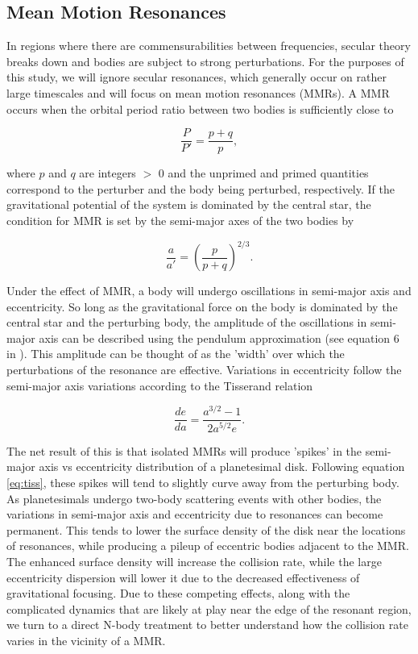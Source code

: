 \documentclass[twocolumn]{aastex63}
\begin{document}
\subsection{Mean Motion Resonances}

In regions where there are commensurabilities between frequencies, secular theory breaks down and bodies are subject to strong 
perturbations. For the purposes of this study, we will ignore secular resonances, which generally occur on rather large timescales 
and will focus on mean motion resonances (MMRs). A MMR occurs  when the orbital period ratio between two bodies is sufficiently 
close to

\begin{equation}\label{eq:per_mmr}
	\frac{P}{P'} = \frac{p + q}{p},
\end{equation}

\noindent where  $p$ and $q$ are integers $>$ 0 and the unprimed and primed quantities correspond to the perturber and the body 
being perturbed, respectively. If the gravitational potential of the system is dominated by the central star, the condition for MMR is set 
by the semi-major axes of the two bodies by

\begin{equation}\label{eq:a_mmr}
	\frac{a}{a'} = \left( \frac{p}{p + q} \right)^{2/3}.
\end{equation}

Under the effect of MMR, a body will undergo oscillations in semi-major axis and eccentricity. So long as the gravitational force on 
the body is dominated by the central star and the perturbing body, the amplitude of the oscillations in semi-major axis can be 
described using the pendulum approximation (see equation 6 in \citet{2019MNRAS.489.2159W}). This amplitude can be thought of 
as the 'width' over which the perturbations of the resonance are effective. Variations in eccentricity follow the semi-major axis 
variations according to the Tisserand relation

\begin{equation}\label{eq:tiss}
	\frac{de}{da} = \frac{a^{3/2} - 1}{2 a^{5/2} e}.
\end{equation}

The net result of this is that isolated MMRs will produce 'spikes' in the semi-major axis vs eccentricity distribution of a planetesimal 
disk. Following equation \ref{eq:tiss}, these spikes will tend to slightly curve away from the perturbing body. As planetesimals 
undergo two-body scattering events with other bodies, the variations in semi-major axis and eccentricity due to resonances can 
become permanent. This tends to lower the surface density of the disk near the locations of resonances, while producing a pileup of 
eccentric bodies adjacent to the MMR. The enhanced surface density will increase the collision rate, while the large eccentricity 
dispersion will lower it due to the decreased effectiveness of gravitational focusing. Due to these competing effects, along with the 
complicated dynamics that are likely at play near the edge of the resonant region, we turn to a direct N-body treatment to better 
understand how the collision rate varies in the vicinity of a MMR.
\end{document}
